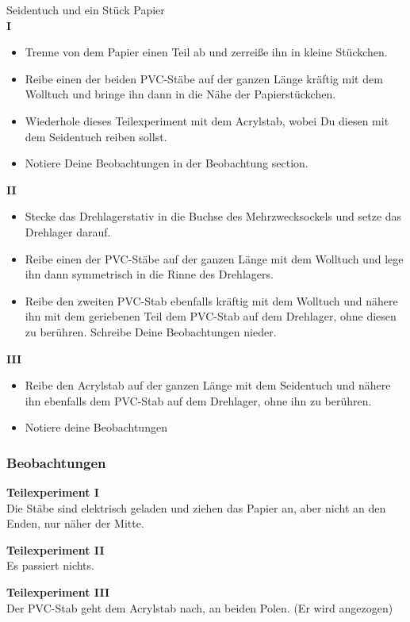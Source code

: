 \documentclass{report}
\begin{document}
Seidentuch und ein Stück Papier\\ \textbf{I}\\ \begin{itemize} \item Trenne von
  dem Papier einen Teil ab und zerreiße ihn in kleine Stückchen. \item Reibe
  einen der beiden PVC-Stäbe auf der ganzen Länge kräftig mit dem Wolltuch und
  bringe ihn dann in die Nähe der Papierstückchen. \item Wiederhole dieses
Teilexperiment mit dem Acrylstab, wobei Du diesen mit dem Seidentuch reiben
sollst. \item Notiere Deine Beobachtungen in der Beobachtung section.
\end{itemize} \textbf{II}\\ \begin{itemize} \item Stecke das Drehlagerstativ in
die Buchse des Mehrzwecksockels und setze das Drehlager darauf. \item Reibe
einen der PVC-Stäbe auf der ganzen Länge mit dem Wolltuch und lege ihn dann
symmetrisch in die Rinne des Drehlagers. \item Reibe den zweiten PVC-Stab
ebenfalls kräftig mit dem Wolltuch und nähere ihn mit dem geriebenen Teil dem
PVC-Stab auf dem Drehlager, ohne diesen zu berühren. Schreibe Deine
Beobachtungen nieder.\\ \end{itemize} \noindent\textbf{III}\\ \begin{itemize}
\item Reibe den Acrylstab auf der ganzen Länge mit dem Seidentuch und nähere
  ihn ebenfalls dem PVC-Stab auf dem Drehlager, ohne ihn zu berühren. \item
  Notiere deine Beobachtungen \end{itemize}

  \subsubsection{Beobachtungen} \textbf{Teilexperiment I}\\ Die Stäbe sind
  elektrisch geladen und ziehen das Papier an, aber nicht an den Enden, nur
  näher der Mitte.

\noindent\textbf{Teilexperiment II}\\
Es passiert nichts.


\noindent\textbf{Teilexperiment III}\\ Der PVC-Stab geht dem Acrylstab nach, an
beiden Polen. (Er wird angezogen)
\end{document}
